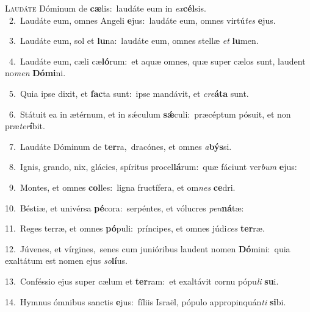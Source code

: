 \lettrine{\initial\textcolor{\initialcolor}{L}}{audáte} Dóminum de \textbf{cæ}\-lis:~\star laudáte eum in \textit{ex}\-\textbf{cél}sis.\\
{\numbfont\textcolor{\numbcolor}{~2.}}~Laudáte eum, omnes Angeli \textbf{e}\-jus:~\star laudáte eum, omnes virtú\textit{tes} \textbf{e}\-jus.\par
{\numbfont\textcolor{\numbcolor}{~3.}}~Laudáte eum, sol et \textbf{lu}\-na:~\star laudáte eum, omnes stellæ \textit{et} \textbf{lu}\-men.\par
{\numbfont\textcolor{\numbcolor}{~4.}}~Laudáte eum, cæli cæ\-\textbf{ló}\-rum:~\star et aquæ omnes, quæ super cælos sunt, laudent no\textit{men} \textbf{Dó}\-\textbf{mi}ni.\par
{\numbfont\textcolor{\numbcolor}{~5.}}~Quia ipse dixit, et \textbf{fac}\-ta sunt:~\star ipse mandávit, et \textit{cre}\-\textbf{á}\textbf{ta} sunt.\par
{\numbfont\textcolor{\numbcolor}{~6.}}~Státuit ea in ætérnum, et in sǽculum \textbf{sǽ}\-culi:~\star præcéptum pósuit, et non præ\-\textit{ter}\-\textbf{í}bit.\par
{\numbfont\textcolor{\numbcolor}{~7.}}~Laudáte Dóminum de \textbf{ter}\-ra,~\star dracónes, et omnes \textit{a}\-\textbf{býs}si.\par
{\numbfont\textcolor{\numbcolor}{~8.}}~Ignis, grando, nix, glácies, spíritus procel\-\textbf{lá}\-rum:~\star quæ fáciunt ver\textit{bum} \textbf{e}\-jus:\par
{\numbfont\textcolor{\numbcolor}{~9.}}~Montes, et omnes \textbf{col}\-les:~\star ligna fructífera, et om\textit{nes} \textbf{ce}\-dri.\par
{\numbfont\textcolor{\numbcolor}{10.}}~Béstiæ, et univérsa \textbf{pé}\-cora:~\star serpéntes, et vólucres \textit{pen}\-\textbf{ná}tæ:\par
{\numbfont\textcolor{\numbcolor}{11.}}~Reges terræ, et omnes \textbf{pó}\-puli:~\star príncipes, et omnes júdi\textit{ces} \textbf{ter}\-ræ.\par
{\numbfont\textcolor{\numbcolor}{12.}}~Júvenes, et vírgines,~\dagger senes cum junióribus laudent nomen \textbf{Dó}\-mini:~\star quia exaltátum est nomen ejus \textit{so}\-\textbf{lí}us.\par
{\numbfont\textcolor{\numbcolor}{13.}}~Conféssio ejus super cælum et \textbf{ter}\-ram:~\star et exaltávit cornu pópu\textit{li} \textbf{su}\-i.\par
{\numbfont\textcolor{\numbcolor}{14.}}~Hymnus ómnibus sanctis \textbf{e}\-jus:~\star fíliis Israël, pópulo appropinquán\textit{ti} \textbf{si}\-bi.\par
